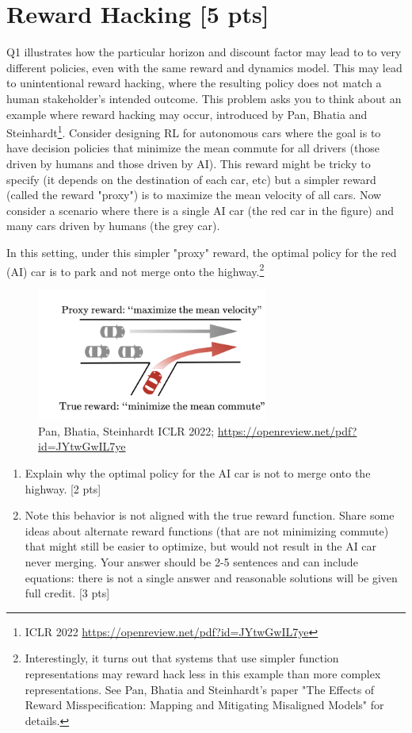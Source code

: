 
\section{Reward Hacking [5 pts]} 
Q1  illustrates how the particular  horizon and discount factor may lead to 
    to very different policies, even with the same reward and dynamics model. This may lead to unintentional reward hacking, where the resulting policy does not match a human stakeholder's intended outcome. This problem asks you to think about an example where reward hacking may occur, introduced by Pan, Bhatia and Steinhardt\footnote{ICLR 2022 \url{https://openreview.net/pdf?id=JYtwGwIL7ye}}. Consider designing RL for autonomous cars where the goal is to have decision policies that minimize the mean commute for all drivers (those driven by humans and those driven by AI). This reward might be tricky to specify (it depends on the destination of each car, etc) but a simpler reward (called the reward "proxy") is to maximize the mean velocity of all cars. Now consider a scenario where there is a single AI car (the red car in the figure) and many cars driven by humans (the grey car). 

    In this setting, under this simpler "proxy" reward, the optimal policy for the red (AI) car is to park and not merge onto the highway.\footnote{Interestingly, it turns out that systems that use simpler function representations may reward hack less in this example than more complex representations. See Pan, Bhatia and Steinhardt's paper "The Effects of Reward Misspecification: Mapping and Mitigating Misaligned Models" for details.}
        \begin{figure}[h]
    \centering
    \includegraphics[width=3in]{commute_time.png}
    \caption{Pan, Bhatia, Steinhardt ICLR 2022; \url{https://openreview.net/pdf?id=JYtwGwIL7ye}}
    \label{fig:commute}
\end{figure}
\begin{enumerate}[label=(\alph*)]
    \item  Explain why the optimal policy for the AI car is not to merge onto the highway. [2 pts]
    \item Note this behavior is not aligned with the true reward function. Share some ideas about alternate reward functions (that are not minimizing commute) that might still be easier to optimize, but would not result in the AI car never merging. Your answer should be 2-5 sentences and can include equations: there is not a single answer and reasonable solutions will be given full credit. [3 pts]

\end{enumerate}

